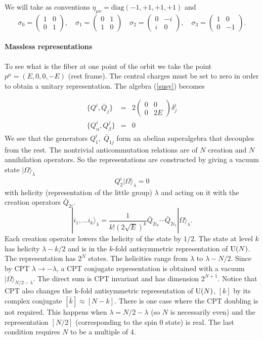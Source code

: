 \documentclass[a4paper,12pt]{article}
\begin{document}
We will take as conventions $\eta_{\mu\nu}=\mathrm{diag}(-1,+1,+1,+1)$ and
$$\sigma_0=\begin{pmatrix}1&0\\0&1\end{pmatrix},\quad \sigma_1=\begin{pmatrix}0&1\\1&0\end{pmatrix}
   \quad \sigma_2=\begin{pmatrix}0&-i\\i&0\end{pmatrix},\quad
   \sigma_3=\begin{pmatrix}1&0\\0&-1\end{pmatrix}.$$





\paragraph{Massless representations}
 To see what is the fiber at one point of the orbit we take the point  $p^\mu=(E,0,0,-E)$ (rest frame).
  The central charges must
be set to zero in order to obtain a unitary representation.  The
algebra (\ref{susy}) becomes

\begin{eqnarray}\{Q^i,\bar
Q_{j}\}&=&2\begin{pmatrix}0&0\\0&2E\end{pmatrix}
 \delta^i_j\nonumber \\\{Q_\alpha^i, Q_{\beta}^j\}&=&0
 \label{susymassless}
 \end{eqnarray}
 We see that the generators $Q^i_1,\;\bar Q_{1j}$ form an abelian superalgebra that decouples from the
 rest. The nontrivial anticommutation relations  are of  $N$
 creation and $N$ annihilation  operators. So the representations
 are constructed by giving a vacuum state $|\Omega\rangle_\lambda$
 $$Q_2^i|\Omega\rangle_\lambda=0$$ with
 helicity (representation of the little group)  $\lambda $
and acting on it with the creation operators
 $\bar Q_{2i}$.
 $$|i_1,\dots i_k\rangle_\lambda=\frac{1}{k!(2\sqrt E)^k}\bar
 Q_{2i_k}\cdots \bar Q_{2i_1}|\Omega\rangle_\lambda.$$
 Each creation operator lowers the helicity of the state by $1/2$.
 The state at level $k$ has helicity $\lambda-k/2$ and is in the
 $k$-fold
 antisymmetric representation of $\mathrm{U}(N)$.
  The representation has  $2^N$ states. The helicities range from  $\lambda$ to $\lambda-N/2$.
  Since by CPT $\lambda \rightarrow -\lambda$, a CPT conjugate representation is obtained with a
  vacuum $|\Omega\rangle_{N/2-\lambda}$. The direct sum is CPT invariant and has dimension $2^{N+1}$.
   Notice that CPT  also changes the k-fold antisymmetric representation of $\mathrm{U}(N)$, $[k]$ by its
    complex conjugate $[\bar k]\approx [N-k]$. There is one case where the CPT doubling is not required.
     This happens when  $\lambda=N/2-\lambda$ (so  $N$ is  necessarily even) and the representation
      $[N/2]$ (corresponding to the spin 0 state) is real. The last condition requires $N$ to be a multiple of 4.
\end{document}
